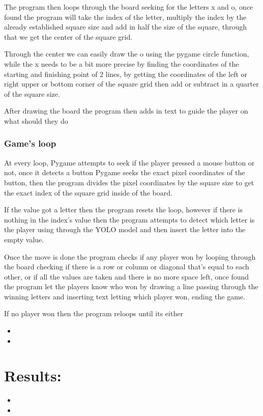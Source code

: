 \documentclass[11pt]{article}
\begin{document}
The program then loops through the board seeking for the letters x and o, once found the program will take the index of the letter, multiply the index by the already established square size and add in half the size of the square, through that we get the center of the square grid.

Through the center we can easily draw the o using the pygame circle function, while the x needs to be a bit more precise by finding the coordinates of the starting and finishing point of 2 lines, by getting the coordinates of the left or right upper or bottom corner of the square grid then add or subtract in a quarter of the square size.

After drawing the board the program then adds in text to guide the player on what should they do

\subsubsection{Game's loop}
At every loop, Pygame attempts to seek if the player pressed a mouse button or not, once it detects a button Pygame seeks the exact pixel coordinates of the button, then the program divides the pixel coordinates by the square size to get the exact index of the square grid inside of the board.

If the value got a letter then the program resets the loop, however if there is nothing in the index's value then the program attempts to detect which letter is the player using through the YOLO model and then insert the letter into the empty value.

Once the move is done the program checks if any player won by looping through the board checking if there is a row or column or diagonal that's equal to each other, or if all the values are taken and there is no more space left, once found the program let the players know who won by drawing a line passing through the winning letters and inserting text letting which player won, ending the game.

If no player won then the program reloops until its either


\begin{itemize}
  \item 
  \item 
\end{itemize}
\section{Results:}
\begin{itemize}
  \item 
  \item 
\end{itemize}
\end{document}
